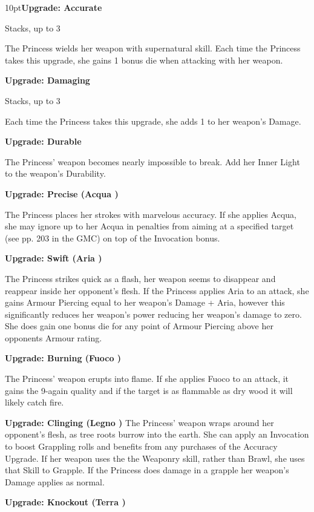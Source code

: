 \begin{myindentpar}{10pt}\textbf{Upgrade: Accurate}

Stacks, up to 3

The Princess wields her weapon with supernatural skill. Each time the Princess takes this upgrade, she gains 1 bonus die when attacking with her weapon.

\textbf{Upgrade: Damaging}

Stacks, up to 3

Each time the Princess takes this upgrade, she adds 1 to her weapon’s Damage. 

\textbf{Upgrade: Durable}

The Princess' weapon becomes nearly impossible to break. Add her Inner Light to the weapon's Durability.

\textbf{Upgrade: Precise (Acqua \textbullet\textbullet)}

The Princess places her strokes with marvelous accuracy. If she applies Acqua, she may ignore up to her Acqua in penalties from aiming at a specified target (see pp. 203 in the GMC) on top of the Invocation bonus.

\textbf{Upgrade: Swift (Aria \textbullet\textbullet)}

The Princess strikes quick as a flash, her weapon seems to disappear and reappear inside her opponent's flesh. If the Princess applies Aria to an attack, she gains Armour Piercing equal to her weapon's Damage + Aria, however this significantly reduces her weapon's power reducing her weapon's damage to zero. She does gain one bonus die for any point of Armour Piercing above her opponents Armour rating. 

\textbf{Upgrade: Burning (Fuoco \textbullet\textbullet)}

The Princess' weapon erupts into flame. If she applies Fuoco to an attack, it gains the 9-again quality and if the target is as flammable as dry wood it will likely catch fire. 

\textbf{Upgrade: Clinging (Legno \textbullet\textbullet)}
The Princess' weapon wraps around her opponent's flesh, as tree roots burrow into the earth. She can apply an Invocation to boost Grappling rolls and benefits from any purchases of the Accuracy Upgrade. If her weapon uses the  the Weaponry skill, rather than Brawl, she uses that Skill to Grapple. If the Princess does damage in a grapple her weapon's Damage applies as normal.


\textbf{Upgrade: Knockout (Terra \textbullet\textbullet)}


\end{myindentpar}
